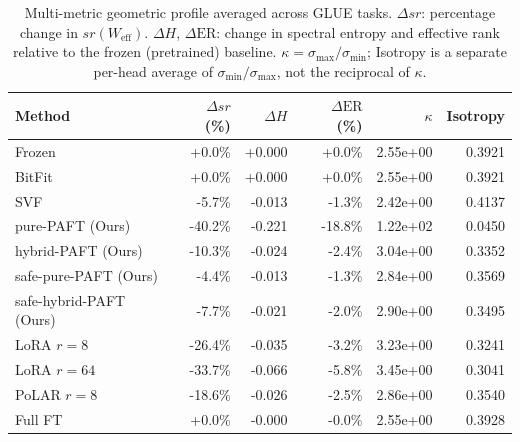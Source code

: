 \begin{table}[t]
\centering
\caption{Multi-metric geometric profile averaged across GLUE tasks. $\Delta sr$: percentage change in $sr(W_\mathrm{eff})$. $\Delta H$, $\Delta\mathrm{ER}$: change in spectral entropy and effective rank relative to the frozen (pretrained) baseline. $\kappa = \sigma_\mathrm{max}/\sigma_\mathrm{min}$; Isotropy is a separate per-head average of $\sigma_\mathrm{min}/\sigma_\mathrm{max}$, not the reciprocal of $\kappa$.}
\label{tab:all_metrics}
\setlength{\tabcolsep}{5pt}
\renewcommand{\arraystretch}{1.10}
\begin{tabular}{lrrrrr}
\toprule
\textbf{Method} & $\Delta sr$ (\%) & $\Delta H$ & $\Delta\mathrm{ER}$ (\%) & $\kappa$ & Isotropy \\
\midrule
Frozen & +0.0\% & +0.000 & +0.0\% & 2.55e+00 & 0.3921 \\
\midrule
BitFit & +0.0\% & +0.000 & +0.0\% & 2.55e+00 & 0.3921 \\
SVF & -5.7\% & -0.013 & -1.3\% & 2.42e+00 & 0.4137 \\
\midrule
pure-PAFT (Ours) & -40.2\% & -0.221 & -18.8\% & 1.22e+02 & 0.0450 \\
hybrid-PAFT (Ours) & -10.3\% & -0.024 & -2.4\% & 3.04e+00 & 0.3352 \\
safe-pure-PAFT (Ours) & -4.4\% & -0.013 & -1.3\% & 2.84e+00 & 0.3569 \\
safe-hybrid-PAFT (Ours) & -7.7\% & -0.021 & -2.0\% & 2.90e+00 & 0.3495 \\
\midrule
LoRA $r{=}8$ & -26.4\% & -0.035 & -3.2\% & 3.23e+00 & 0.3241 \\
LoRA $r{=}64$ & -33.7\% & -0.066 & -5.8\% & 3.45e+00 & 0.3041 \\
PoLAR $r{=}8$ & -18.6\% & -0.026 & -2.5\% & 2.86e+00 & 0.3540 \\
\midrule
Full FT & +0.0\% & -0.000 & -0.0\% & 2.55e+00 & 0.3928 \\
\bottomrule
\end{tabular}
\end{table}
